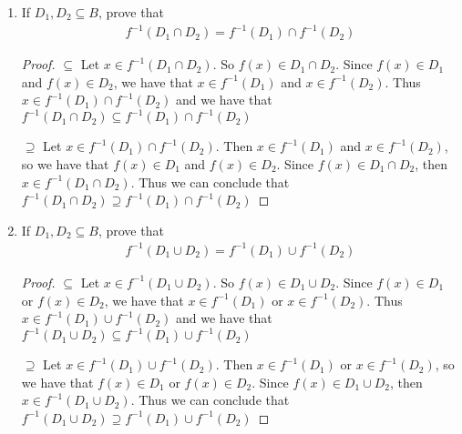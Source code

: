\documentclass[11pt, oneside]{article}   	%
\begin{document}
\begin{enumerate}[\quad(a)]
	\item If $D_1, D_2 \subseteq B$, prove that 
	\begin{align*}
 		 f^{-1}(D_1 \cap D_2) = f^{-1}(D_1) \cap f^{-1}(D_2)  
	\end{align*}
	\begin{proof}
		$\subseteq$ Let $x \in f^{-1}(D_1 \cap D_2)$. So $f(x) \in D_1 \cap D_2$. Since $f(x) \in D_1$ and $f(x) \in D_2$, we have that $x \in f^{-1}(D_1)$ and $x \in f^{-1}(D_2)$. Thus $x \in f^{-1}(D_1) \cap f^{-1}(D_2)$ and we have that $f^{-1}(D_1 \cap D_2) \subseteq f^{-1}(D_1) \cap f^{-1}(D_2)$ 
		
		$\supseteq$ Let $x \in f^{-1}(D_1) \cap f^{-1}(D_2)$. Then $x \in f^{-1}(D_1)$ and $x \in f^{-1}(D_2)$, so we have that $f(x) \in D_1$ and $f(x) \in D_2$. Since $f(x) \in D_1 \cap D_2$, then $x \in f^{-1}(D_1 \cap D_2)$. Thus we can conclude that $f^{-1}(D_1 \cap D_2) \supseteq f^{-1}(D_1) \cap f^{-1}(D_2)$ 
		
	\end{proof}
	
	\item If $D_1, D_2 \subseteq B$, prove that 
	\begin{align*}
  		f^{-1}(D_1 \cup D_2) = f^{-1}(D_1) \cup f^{-1}(D_2)  
	\end{align*}
	\begin{proof}
		$\subseteq$ Let $x \in f^{-1}(D_1 \cup D_2)$. So $f(x) \in D_1 \cup D_2$. Since $f(x) \in D_1$ or $f(x) \in D_2$, we have that $x \in f^{-1}(D_1)$ or $x \in f^{-1}(D_2)$. Thus $x \in f^{-1}(D_1) \cup f^{-1}(D_2)$ and we have that $f^{-1}(D_1 \cup D_2) \subseteq f^{-1}(D_1) \cup f^{-1}(D_2)$ 
		
		$\supseteq$ Let $x \in f^{-1}(D_1) \cup f^{-1}(D_2)$. Then $x \in f^{-1}(D_1)$ or $x \in f^{-1}(D_2)$, so we have that $f(x) \in D_1$ or $f(x) \in D_2$. Since $f(x) \in D_1 \cup D_2$, then $x \in f^{-1}(D_1 \cup D_2)$. Thus we can conclude that $f^{-1}(D_1 \cup D_2) \supseteq f^{-1}(D_1) \cup f^{-1}(D_2)$ 

	\end{proof}
	

\end{enumerate}
\end{document}
